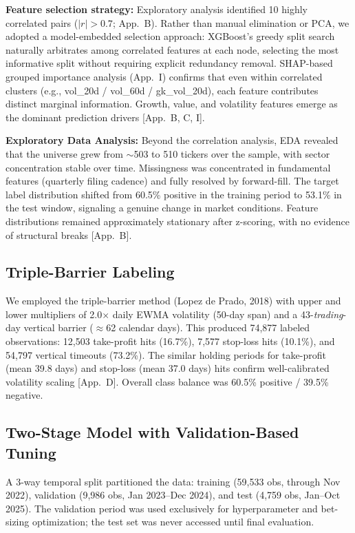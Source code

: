 \documentclass[11pt, a4paper]{article}
\begin{document}
\textbf{Feature selection strategy:} Exploratory analysis identified 10 highly correlated pairs ($|r|>0.7$; App.\ B). Rather than manual elimination or PCA, we adopted a model-embedded selection approach: XGBoost's greedy split search naturally arbitrates among correlated features at each node, selecting the most informative split without requiring explicit redundancy removal. SHAP-based grouped importance analysis (App.\ I) confirms that even within correlated clusters (e.g., vol\_20d / vol\_60d / gk\_vol\_20d), each feature contributes distinct marginal information. Growth, value, and volatility features emerge as the dominant prediction drivers [App.\ B, C, I].

\textbf{Exploratory Data Analysis:} Beyond the correlation analysis, EDA revealed that the universe grew from $\sim$503 to 510 tickers over the sample, with sector concentration stable over time. Missingness was concentrated in fundamental features (quarterly filing cadence) and fully resolved by forward-fill. The target label distribution shifted from 60.5\% positive in the training period to 53.1\% in the test window, signaling a genuine change in market conditions. Feature distributions remained approximately stationary after z-scoring, with no evidence of structural breaks [App.\ B].

\subsection{Triple-Barrier Labeling}
We employed the triple-barrier method (Lopez de Prado, 2018) with upper and lower multipliers of 2.0$\times$ daily EWMA volatility (50-day span) and a 43-\emph{trading}-day vertical barrier ($\approx$62 calendar days). This produced 74,877 labeled observations: 12,503 take-profit hits (16.7\%), 7,577 stop-loss hits (10.1\%), and 54,797 vertical timeouts (73.2\%). The similar holding periods for take-profit (mean 39.8 days) and stop-loss (mean 37.0 days) hits confirm well-calibrated volatility scaling [App.\ D]. Overall class balance was 60.5\% positive / 39.5\% negative.

\subsection{Two-Stage Model with Validation-Based Tuning}
A 3-way temporal split partitioned the data: training (59,533 obs, through Nov 2022), validation (9,986 obs, Jan 2023--Dec 2024), and test (4,759 obs, Jan--Oct 2025). The validation period was used exclusively for hyperparameter and bet-sizing optimization; the test set was never accessed until final evaluation.
\end{document}
